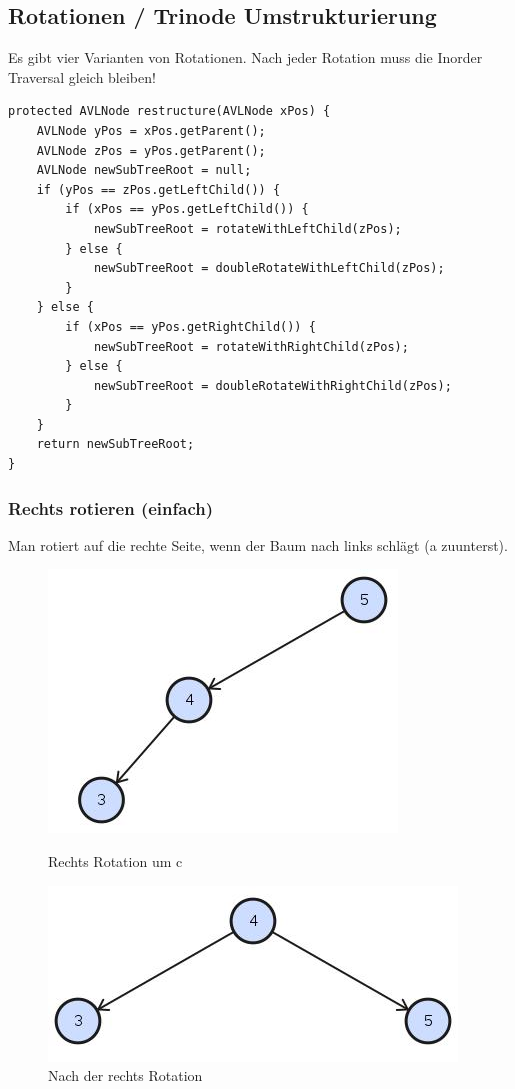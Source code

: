 \clearpage

\subsection{Rotationen / Trinode Umstrukturierung}
Es gibt vier Varianten von Rotationen. Nach jeder Rotation muss die Inorder Traversal gleich bleiben!
\begin{lstlisting}[caption=AVL Tree Rotations]
protected AVLNode restructure(AVLNode xPos) {
	AVLNode yPos = xPos.getParent();
	AVLNode zPos = yPos.getParent();
	AVLNode newSubTreeRoot = null;
	if (yPos == zPos.getLeftChild()) {
		if (xPos == yPos.getLeftChild()) {
			newSubTreeRoot = rotateWithLeftChild(zPos);
		} else {
			newSubTreeRoot = doubleRotateWithLeftChild(zPos);
		}
	} else {
		if (xPos == yPos.getRightChild()) {
			newSubTreeRoot = rotateWithRightChild(zPos);
		} else {
			newSubTreeRoot = doubleRotateWithRightChild(zPos);
		}
	}
	return newSubTreeRoot;
}
\end{lstlisting}

\subsubsection{Rechts rotieren (einfach)}
Man rotiert auf die rechte Seite, wenn der Baum nach links schlägt (a zuunterst).
\begin{figure}[h!]
	\centering
	\begin{minipage}[t]{0.4\textwidth}
		\centering
		\includegraphics[width=0.7\linewidth]{images/avl_right_rotation_1}
		\caption{Rechts Rotation um c}
		\label{fig:trieexample}
	\end{minipage}
	\begin{minipage}[t]{0.4\textwidth}
		\centering
		\includegraphics[width=0.9\linewidth]{images/avl_rotation_final}
		\caption{Nach der rechts Rotation}
		\label{fig:searchtreeinsert2}
	\end{minipage}
\end{figure}


